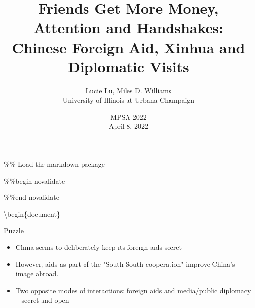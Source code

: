 \documentclass[
  ignorenonframetext,
]{beamer}
\author{}
\date{\vspace{-2.5em}}
\begin{document}
\begin{frame}
\%\% Load the markdown package

\usepackage[citations,footnotes,definitionLists,hashEnumerators,smartEllipses,tightLists=false,pipeTables,tableCaptions,hybrid]{markdown}

\%\%begin novalidate 

\%\%end novalidate


\title{Friends Get More Money, Attention and Handshakes:
Chinese Foreign Aid, Xinhua and Diplomatic Visits}

\author{Lucie Lu, Miles D. Williams\\ University of Illinois at Urbana-Champaign}
\date {MPSA 2022 \\ April 8, 2022}

\textbackslash begin\{document\}

\maketitle

\begin{frame}{Puzzle}

\begin{itemize}
    \item China seems to deliberately keep its foreign aids secret
    \item However, aids as part of the "South-South cooperation" improve China's image abroad.
    \item Two opposite modes of interactions: foreign aids and media/public diplomacy -- secret and open
\end{itemize}


    
\end{frame}


\end{frame}
\end{document}
